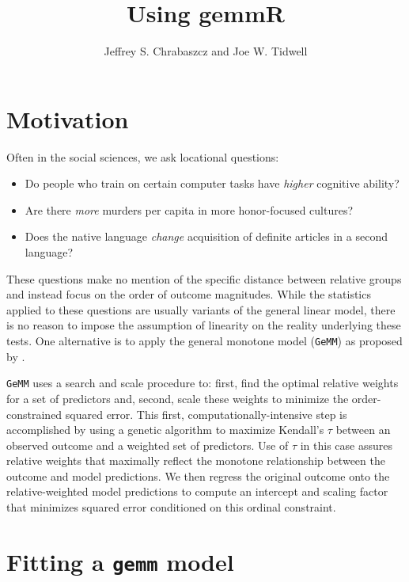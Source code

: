 \documentclass{article}\usepackage[]{graphicx}\usepackage[]{color}
\title{Using gemmR}
\author{Jeffrey S. Chrabaszcz and Joe W. Tidwell}
\begin{document}
\maketitle

\section*{Motivation}

Often in the social sciences, we ask locational questions:

\begin{itemize}
  \item Do people who train on certain computer tasks have \emph{higher} cognitive ability? \citep{tidwell2014counts}
  \item Are there \emph{more} murders per capita in more honor-focused cultures? \citep{dougherty2014deceptive}
  \item Does the native language \emph{change} acquisition of definite articles in a second language? \citep{chrabaszcz2014role}
\end{itemize}

These questions make no mention of the specific distance between relative groups and instead focus on the order of outcome magnitudes.
While the statistics applied to these questions are usually variants of the general linear model, there is no reason to impose the assumption of linearity on the reality underlying these tests.
One alternative is to apply the general monotone model (\texttt{GeMM}) as proposed by \citet{dougherty2012robust}.

\texttt{GeMM} uses a search and scale procedure to: first, find the optimal relative weights for a set of predictors and, second, scale these weights to minimize the order-constrained squared error.
This first, computationally-intensive step is accomplished by using a genetic algorithm to maximize Kendall's $\tau$ between an observed outcome and a weighted set of predictors.
Use of $\tau$ in this case assures relative weights that maximally reflect the monotone relationship between the outcome and model predictions.
We then regress the original outcome onto the relative-weighted model predictions to compute an intercept and scaling factor that minimizes squared error conditioned on this ordinal constraint.

\section*{Fitting a \texttt{gemm} model}
\end{document}
